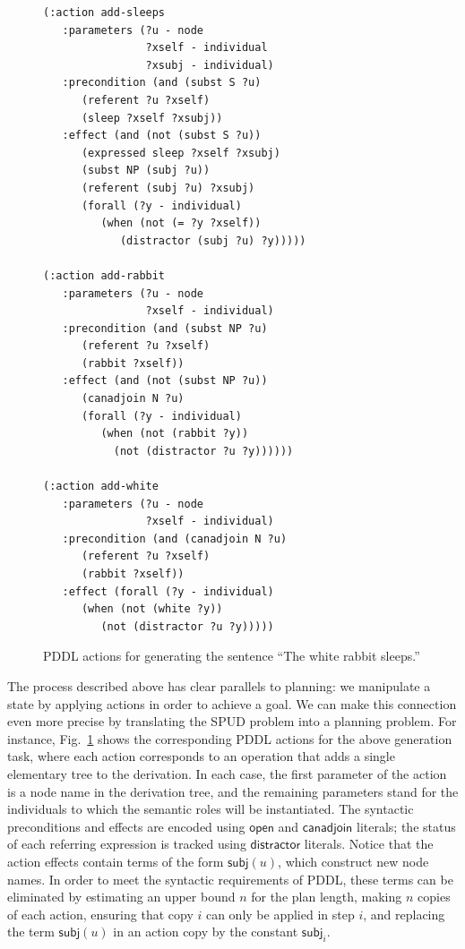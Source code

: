 \begin{figure}[t]
\centering
{\small%
\begin{verbatim}
(:action add-sleeps
   :parameters (?u - node
                ?xself - individual
                ?xsubj - individual)
   :precondition (and (subst S ?u)
      (referent ?u ?xself)
      (sleep ?xself ?xsubj))
   :effect (and (not (subst S ?u))
      (expressed sleep ?xself ?xsubj)
      (subst NP (subj ?u))
      (referent (subj ?u) ?xsubj)
      (forall (?y - individual)
         (when (not (= ?y ?xself))
            (distractor (subj ?u) ?y)))))

(:action add-rabbit
   :parameters (?u - node
                ?xself - individual)
   :precondition (and (subst NP ?u)
      (referent ?u ?xself)
      (rabbit ?xself))
   :effect (and (not (subst NP ?u))
      (canadjoin N ?u)
      (forall (?y - individual)
         (when (not (rabbit ?y))
           (not (distractor ?u ?y))))))

(:action add-white
   :parameters (?u - node
                ?xself - individual)
   :precondition (and (canadjoin N ?u)
      (referent ?u ?xself)
      (rabbit ?xself))
   :effect (forall (?y - individual)
      (when (not (white ?y))
         (not (distractor ?u ?y)))))
\end{verbatim}}%
\caption{PDDL actions for generating the sentence ``The white rabbit
sleeps.''}
\label{fig:white-rabbit-as-planning}
\end{figure}


The process described above has clear parallels to planning: we manipulate
a state by applying actions in order to achieve a goal. We can make this
connection even more precise by translating the SPUD problem into a
planning problem. For instance, Fig.~\ref{fig:white-rabbit-as-planning}
shows the corresponding PDDL actions for the above generation task, where
each action corresponds to an operation that adds a single elementary tree
to the derivation.  In each case, the first parameter of the action is a
node name in the derivation tree, and the remaining parameters stand for
the individuals to which the semantic roles will be instantiated.  The
syntactic preconditions and effects are encoded using $\mathsf{open}$ and
$\mathsf{canadjoin}$ literals; the status of each referring expression is
tracked using $\mathsf{distractor}$ literals. Notice that the action
effects contain terms of the form $\mathsf{subj}(u)$, which construct new
node names. In order to meet the syntactic requirements of PDDL, these
terms can be eliminated by estimating an upper bound $n$ for the plan
length, making $n$ copies of each action, ensuring that copy $i$ can only
be applied in step $i$, and replacing the term $\mathsf{subj}(u)$ in an
action copy by the constant $\mathsf{subj}_i$.

